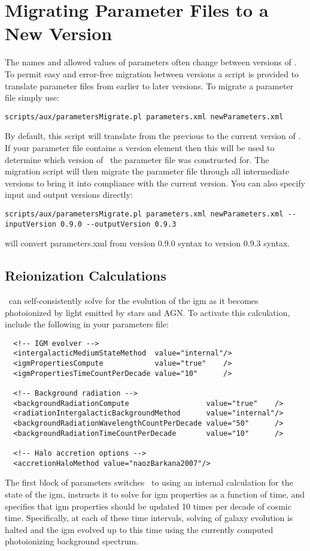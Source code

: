 \section{Migrating Parameter Files to a New Version}\label{sec:MigrateParameters}

The names and allowed values of parameters often change between versions of \glc. To permit easy and error-free migration between versions a script is provided to translate parameter files from earlier to later versions. To migrate a parameter file simply use:
\begin{verbatim}
scripts/aux/parametersMigrate.pl parameters.xml newParameters.xml
\end{verbatim}
By default, this script will translate from the previous to the current version of \glc. If your parameter file contains a {\normalfont \ttfamily version} element then this will be used to determine which version of \glc\ the parameter file was constructed for. The migration script will then migrate the parameter file through all intermediate versions to bring it into compliance with the current version. You can also specify input and output versions directly:
\begin{verbatim}
scripts/aux/parametersMigrate.pl parameters.xml newParameters.xml --inputVersion 0.9.0 --outputVersion 0.9.3
\end{verbatim}
will convert {\normalfont \ttfamily parameters.xml} from version 0.9.0 syntax to version 0.9.3 syntax.

\subsection{Reionization Calculations}\label{sed:ReionziationTutorial}

\glc\ can self-consistently solve for the evolution of the \gls{igm} as it becomes photoionized by light emitted by stars and AGN. To activate this calculation, include the following in your parameters file:
\begin{verbatim}
  <!-- IGM evolver -->
  <intergalacticMediumStateMethod  value="internal"/>
  <igmPropertiesCompute            value="true"    />
  <igmPropertiesTimeCountPerDecade value="10"      />
  
  <!-- Background radiation -->
  <backgroundRadiationCompute                  value="true"    />
  <radiationIntergalacticBackgroundMethod      value="internal"/>
  <backgroundRadiationWavelengthCountPerDecade value="50"      />
  <backgroundRadiationTimeCountPerDecade       value="10"      />

  <!-- Halo accretion options -->
  <accretionHaloMethod value="naozBarkana2007"/>
\end{verbatim}
The first block of parameters switches \glc\ to using an internal calculation for the state of the \gls{igm}, instructs it to solve for \gls{igm} properties as a function of time, and specifies that \gls{igm} properties should be updated 10 times per decade of cosmic time. Specifically, at each of these time intervals, solving of galaxy evolution is halted and the \gls{igm} evolved up to this time using the currently computed photoionizing background spectrum.

